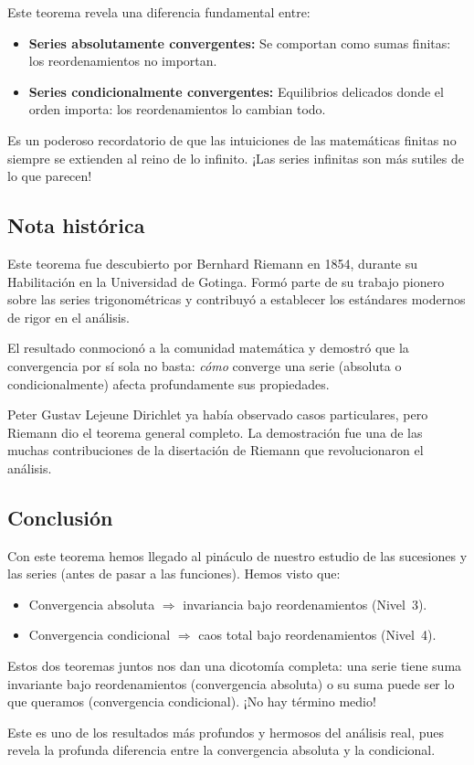 Este teorema revela una diferencia fundamental entre:
\begin{itemize}
  \item \textbf{Series absolutamente convergentes:} Se comportan como sumas finitas: los reordenamientos no importan.
  \item \textbf{Series condicionalmente convergentes:} Equilibrios delicados donde el orden importa: los reordenamientos lo cambian todo.
\end{itemize}
Es un poderoso recordatorio de que las intuiciones de las matemáticas finitas no siempre se extienden al reino de lo infinito. ¡Las series infinitas son más sutiles de lo que parecen!

\subsection{Nota histórica}

Este teorema fue descubierto por Bernhard Riemann en 1854, durante su Habilitación en la Universidad de Gotinga. Formó parte de su trabajo pionero sobre las series trigonométricas y contribuyó a establecer los estándares modernos de rigor en el análisis.

El resultado conmocionó a la comunidad matemática y demostró que la convergencia por sí sola no basta: \emph{cómo} converge una serie (absoluta o condicionalmente) afecta profundamente sus propiedades.

Peter Gustav Lejeune Dirichlet ya había observado casos particulares, pero Riemann dio el teorema general completo. La demostración fue una de las muchas contribuciones de la disertación de Riemann que revolucionaron el análisis.

\subsection{Conclusión}

Con este teorema hemos llegado al pináculo de nuestro estudio de las sucesiones y las series (antes de pasar a las funciones). Hemos visto que:
\begin{itemize}
  \item Convergencia absoluta $\Rightarrow$ invariancia bajo reordenamientos (Nivel~3).
  \item Convergencia condicional $\Rightarrow$ caos total bajo reordenamientos (Nivel~4).
\end{itemize}
Estos dos teoremas juntos nos dan una dicotomía completa: una serie tiene suma invariante bajo reordenamientos (convergencia absoluta) o su suma puede ser lo que queramos (convergencia condicional). ¡No hay término medio!

Este es uno de los resultados más profundos y hermosos del análisis real, pues revela la profunda diferencia entre la convergencia absoluta y la condicional.

